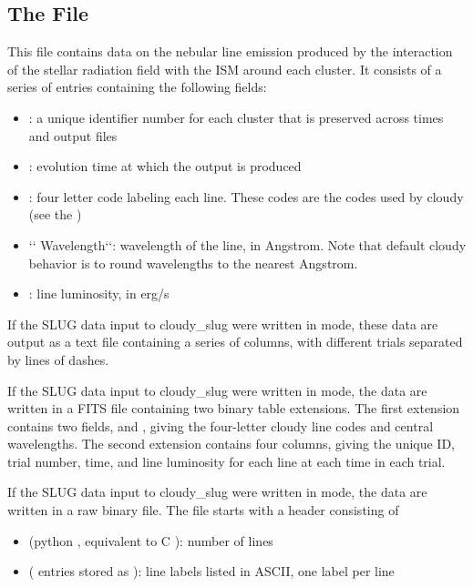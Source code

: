 \documentclass[letterpaper,10pt,english]{sphinxmanual}
\begin{document}
\subsection{The  File}
\label{\detokenize{cloudy:the-cluster-cloudylines-file}}
This file contains data on the nebular line emission produced by the
interaction of the stellar radiation field with the ISM around each
cluster. It consists of a series of entries containing the following
fields:
\begin{itemize}
\item {} 
: a unique identifier number for each cluster that is
preserved across times and output files

\item {} 
: evolution time at which the output is produced

\item {} 
: four letter code labeling each line. These codes
are the codes used by cloudy (see the )

\item {} 
{}`{}` Wavelength{}`{}`: wavelength of the line, in Angstrom. Note that
default cloudy behavior is to round wavelengths to the nearest
Angstrom.

\item {} 
: line luminosity, in erg/s

\end{itemize}

If the SLUG data input to cloudy\_slug were written in  mode,
these data are output as a text file containing a series of columns,
with different trials separated by lines of dashes.

If the SLUG data input to cloudy\_slug were written in  mode,
the data are written in a FITS file containing two binary table
extensions. The first extension contains two fields,  and
, giving the four-letter cloudy line codes and central
wavelengths. The second extension contains four columns, giving the
unique ID, trial number, time, and line luminosity for each line at
each time in each trial.

If the SLUG data input to cloudy\_slug were written in  mode,
the data are written in a raw binary file. The file starts with a
header consisting of
\begin{itemize}
\item {} 
 (python , equivalent to C ): number of lines

\item {} 
 ( entries stored as ): line
labels listed in ASCII, one label per line

\end{itemize}
\end{document}
